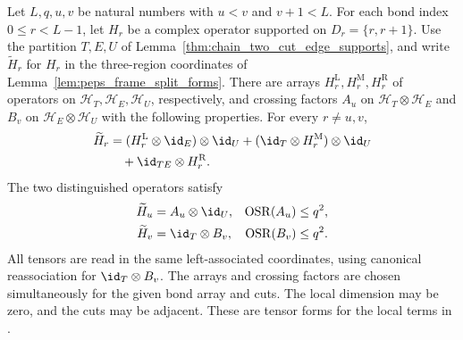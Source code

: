 \begin{lemma}
    \label{thm:chain_two_cut_edge_factors}
    \leanok
    Let $L,q,u,v$ be natural numbers with $u<v$ and $v+1<L$.
    For each bond index $0\le r<L-1$, let $H_r$ be a complex operator
    supported on $D_r=\{r,r+1\}$. Use the partition $T,E,U$ of
    Lemma~\ref{thm:chain_two_cut_edge_supports}, and write $\widetilde H_r$
    for $H_r$ in the three-region coordinates of
    Lemma~\ref{lem:peps_frame_split_forms}.
    There are arrays $H^{\mathrm L}_r,H^{\mathrm M}_r,H^{\mathrm R}_r$
    of operators on $\mathcal H_T,\mathcal H_E,\mathcal H_U$, respectively,
    and crossing factors $A_u$ on $\mathcal H_T\otimes\mathcal H_E$ and
    $B_v$ on $\mathcal H_E\otimes\mathcal H_U$ with the following properties.
    For every $r\ne u,v$,
    \begin{align}
        \widetilde H_r
         & =(H^{\mathrm L}_r\otimes\id_E)\otimes\id_U
        +(\id_T\otimes H^{\mathrm M}_r)\otimes\id_U\notag \\
         & \quad+\id_{TE}\otimes H^{\mathrm R}_r.
        \label{eq:chain_two_cut_ordinary_forms}
    \end{align}
    The two distinguished operators satisfy
    \begin{align}
        \widetilde H_u & =A_u\otimes\id_U,
                       & \operatorname{OSR}(A_u) & \le q^2,\notag \\
        \widetilde H_v & =\id_T\otimes B_v,
                       & \operatorname{OSR}(B_v) & \le q^2.
        \label{eq:chain_two_cut_crossing_forms}
    \end{align}
    All tensors are read in the same left-associated coordinates, using
    canonical reassociation for $\id_T\otimes B_v$.
    The arrays and crossing factors are chosen simultaneously for the given
    bond array and cuts. The local dimension may be zero, and the cuts may
    be adjacent. These are tensor forms for the local terms in
    \cite[Sections~4.1 and~5.2]{Arad2016RigorousRG}.
\end{lemma}
